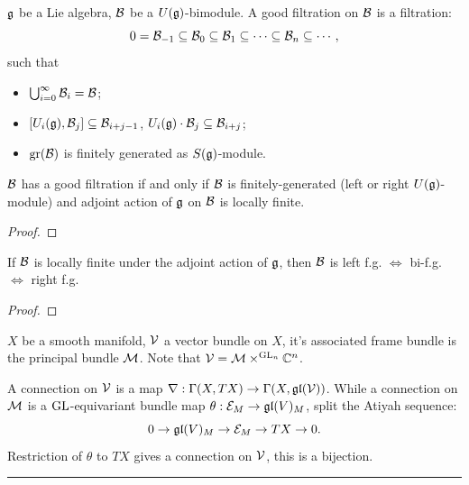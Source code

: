 
$\mathfrak{g}$ be a Lie algebra, $\mathcal{B}$ be a $U(\mathfrak{g})$-bimodule. A good filtration on $\mathcal{B}$ is a filtration:
\[
  0 = \mathcal{B}_{-1} \subseteq \mathcal{B}_{0} \subseteq \mathcal{B}_{1} \subseteq \cdots \subseteq \mathcal{B}_n \subseteq \cdots,
\]
such that
\begin{itemize}
  \item $\bigcup_{i=0}^{\infty} \mathcal{B}_i  = \mathcal{B}$;
  \item $[U_{i}(\mathfrak{g}),\mathcal{B}_j] \subseteq \mathcal{B}_{i+j-1}$, $U_{i}(\mathfrak{g}) \cdot \mathcal{B}_j \subseteq \mathcal{B}_{i+j}$;
  \item $\operatorname{gr}(\mathcal{B})$ is finitely generated as $S(\mathfrak{g})$-module.
\end{itemize}

\begin{thm}
  $\mathcal{B}$ has a good filtration if and only if $\mathcal{B}$ is finitely-generated (left or right $U(\mathfrak{g})$-module) and adjoint action of $\mathfrak{g}$ on $\mathcal{B}$ is locally finite.
\end{thm}

\begin{proof}

\end{proof}


\begin{prop}
  If $\mathcal{B}$ is locally finite under the adjoint action of $\mathfrak{g}$, then $\mathcal{B}$ is left f.g.  $\Leftrightarrow$ bi-f.g. $\Leftrightarrow$ right f.g.
\end{prop}

\begin{proof}

\end{proof}





$X$ be a smooth manifold, $\mathcal{V}$ a vector bundle on $X$, it's associated frame bundle is the principal bundle $\mathcal{M}$. Note that $\mathcal{V} = \mathcal{M} \times^{\operatorname{GL}_n} \mathbb{C}^n$.

A connection on $\mathcal{V}$ is a map $\nabla: \Gamma(X, TX) \to \Gamma(X, \mathfrak{gl}(\mathcal{V}))$. While a connection on $\mathcal{M}$ is a $\operatorname{GL}$-equivariant bundle map $\theta: \mathcal{E}_M \to \mathfrak{gl}(V)_M$, split the Atiyah sequence:
\[
  0 \to \mathfrak{gl}(V)_M \to \mathcal{E}_M \to TX \to 0.
\]
Restriction of $\theta$ to $TX$ gives a connection on $\mathcal{V}$, this is a bijection.


\vspace{2mm}
\hrule
\vspace{3mm}

